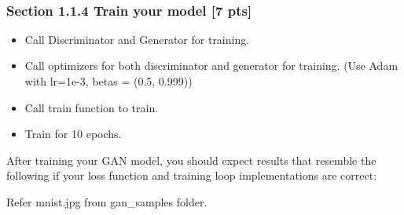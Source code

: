 \documentclass[11pt]{article}
\providecommand{\tightlist}{%
      \setlength{\itemsep}{0pt}\setlength{\parskip}{0pt}}
\begin{document}
    \begin{Verbatim}[commandchars=\\\{\}]

    \end{Verbatim}

    \begin{center}
    \end{center}
    { \hspace*{\fill} \\}
    
    \hypertarget{section-1.1.4-train-your-model-7-pts}{%
\subsubsection{Section 1.1.4 Train your model {[}7
pts{]}}\label{section-1.1.4-train-your-model-7-pts}}

\begin{itemize}
\tightlist
\item
  Call Discriminator and Generator for training.
\item
  Call optimizers for both discriminator and generator for training.
  (Use Adam with lr=1e-3, betas = (0.5, 0.999))
\item
  Call train function to train.
\item
  Train for 10 epochs.
\end{itemize}

    After training your GAN model, you should expect results that resemble
the following if your loss function and training loop implementations
are correct:

 Refer mnist.jpg from gan\_samples folder.
\end{document}
